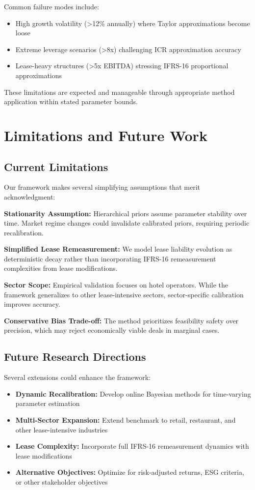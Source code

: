 \documentclass[11pt,a4paper]{article}
\begin{document}
Common failure modes include:
\begin{itemize}
\item High growth volatility (>12\% annually) where Taylor approximations become loose
\item Extreme leverage scenarios (>8x) challenging ICR approximation accuracy  
\item Lease-heavy structures (>5x EBITDA) stressing IFRS-16 proportional approximations
\end{itemize}

These limitations are expected and manageable through appropriate method application within stated parameter bounds.

\section{Limitations and Future Work}

\subsection{Current Limitations}

Our framework makes several simplifying assumptions that merit acknowledgment:

\textbf{Stationarity Assumption:} Hierarchical priors assume parameter stability over time. Market regime changes could invalidate calibrated priors, requiring periodic recalibration.

\textbf{Simplified Lease Remeasurement:} We model lease liability evolution as deterministic decay rather than incorporating IFRS-16 remeasurement complexities from lease modifications.

\textbf{Sector Scope:} Empirical validation focuses on hotel operators. While the framework generalizes to other lease-intensive sectors, sector-specific calibration improves accuracy.

\textbf{Conservative Bias Trade-off:} The method prioritizes feasibility safety over precision, which may reject economically viable deals in marginal cases.

\subsection{Future Research Directions}

Several extensions could enhance the framework:

\begin{itemize}
\item \textbf{Dynamic Recalibration:} Develop online Bayesian methods for time-varying parameter estimation
\item \textbf{Multi-Sector Expansion:} Extend benchmark to retail, restaurant, and other lease-intensive industries
\item \textbf{Lease Complexity:} Incorporate full IFRS-16 remeasurement dynamics with lease modifications
\item \textbf{Alternative Objectives:} Optimize for risk-adjusted returns, ESG criteria, or other stakeholder objectives
\end{itemize}
\end{document}
